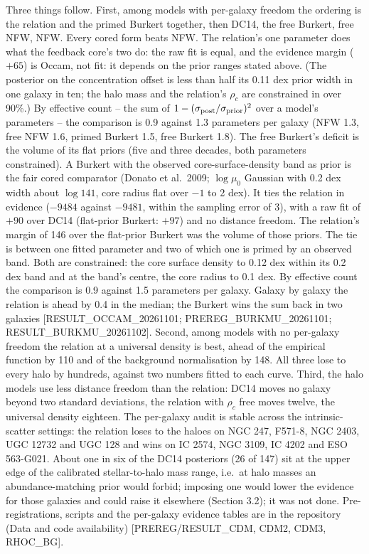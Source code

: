 \documentclass[
  10pt,
]{article}
\begin{document}
Three things follow. First, among models with per-galaxy freedom the ordering is the relation and the primed Burkert together, then DC14, the free Burkert, free NFW, NFW. Every cored form beats NFW. The relation's one parameter does what the feedback core's two do: the raw fit is equal, and the evidence margin ($+65$) is Occam, not fit: it depends on the prior ranges stated above. (The posterior on the concentration offset is less than half its 0.11 dex prior width in one galaxy in ten; the halo mass and the relation's $\rho_c$ are constrained in over 90\%.) By effective count -- the sum of $1-(\sigma_{\rm post}/\sigma_{\rm prior})^2$ over a model's parameters -- the comparison is 0.9 against 1.3 parameters per galaxy (NFW 1.3, free NFW 1.6, primed Burkert 1.5, free Burkert 1.8). The free Burkert's deficit is the volume of its flat priors (five and three decades, both parameters constrained). A Burkert with the observed core-surface-density band as prior is the fair cored comparator (Donato et al.~2009; $\log\mu_0$ Gaussian with 0.2 dex width about $\log 141$, core radius flat over $-1$ to 2 dex). It ties the relation in evidence ($-9484$ against $-9481$, within the sampling error of 3), with a raw fit of $+90$ over DC14 (flat-prior Burkert: $+97$) and no distance freedom. The relation's margin of 146 over the flat-prior Burkert was the volume of those priors. The tie is between one fitted parameter and two of which one is primed by an observed band. Both are constrained: the core surface density to 0.12 dex within its 0.2 dex band and at the band's centre, the core radius to 0.1 dex. By effective count the comparison is 0.9 against 1.5 parameters per galaxy. Galaxy by galaxy the relation is ahead by 0.4 in the median; the Burkert wins the sum back in two galaxies {[}RESULT\_OCCAM\_20261101; PREREG\_BURKMU\_20261101; RESULT\_BURKMU\_20261102{]}. Second, among models with no per-galaxy freedom the relation at a universal density is best, ahead of the empirical function by 110 and of the background normalisation by 148. All three lose to every halo by hundreds, against two numbers fitted to each curve. Third, the halo models use less distance freedom than the relation: DC14 moves no galaxy beyond two standard deviations, the relation with $\rho_c$ free moves twelve, the universal density eighteen. The per-galaxy audit is stable across the intrinsic-scatter settings: the relation loses to the haloes on NGC 247, F571-8, NGC 2403, UGC 12732 and UGC 128 and wins on IC 2574, NGC 3109, IC 4202 and ESO 563-G021. About one in six of the DC14 posteriors (26 of 147) sit at the upper edge of the calibrated stellar-to-halo mass range, i.e.\ at halo masses an abundance-matching prior would forbid; imposing one would lower the evidence for those galaxies and could raise it elsewhere (Section 3.2); it was not done. Pre-registrations, scripts and the per-galaxy evidence tables are in the repository (Data and code availability) {[}PREREG/RESULT\_CDM, CDM2, CDM3, RHOC\_BG{]}.
\end{document}
